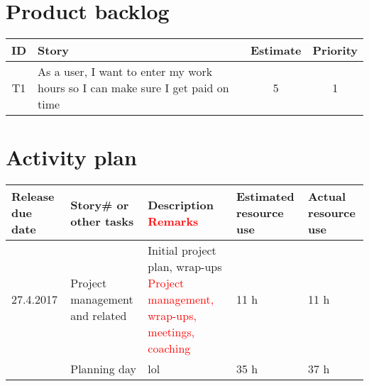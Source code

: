 \appendix

\section{Product backlog}
\begin{tabular}{ c | p{} | c | c}
     ID & Story & Estimate & Priority \\ \hline
     T1 & As a user, I want to enter my work hours so I can make sure I get paid on time & 5 & 1 \\
\end{tabular}

\newpage
\section{Activity plan}
\begin{adjustbox}{center}
\begin{tabular}{ p{0.1\paperwidth} | p{0.1\paperwidth} | p{} | p{0.1\paperwidth} | p{0.1\paperwidth} }
    Release due date & Story\# or other tasks & Description \newline \textcolor{red}{Remarks} & Estimated resource use & Actual resource use \\ \hline
    27.4.2017 & Project management and related & Initial project plan, wrap-ups \textcolor{red}{Project management, wrap-ups, meetings, coaching} & 11 h & 11 h \\ \cline{2-5}
     & Planning day & lol & 35 h & 37 h \\ 
     
\end{tabular}
\end{adjustbox}

\newpage
